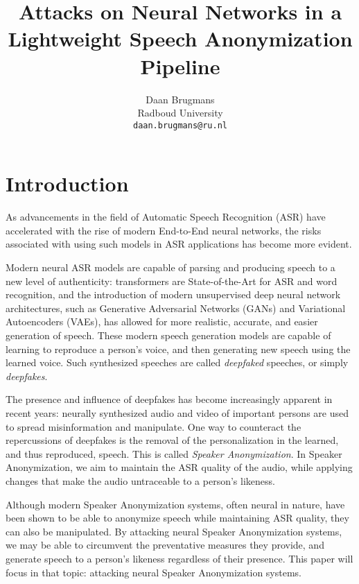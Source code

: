 \documentclass[11pt]{article}
\title{Attacks on Neural Networks in a Lightweight Speech Anonymization Pipeline}
\author{Daan Brugmans \\
  Radboud University\\
  \texttt{daan.brugmans@ru.nl}
}
\begin{document}
\maketitle

\begin{abstract}
  
\end{abstract}

\section{Introduction}
As advancements in the field of Automatic Speech Recognition (ASR) have accelerated with the rise of modern End-to-End neural networks, the risks associated with using such models in ASR applications has become more evident.

Modern neural ASR models are capable of parsing and producing speech to a new level of authenticity: transformers are State-of-the-Art for ASR and word recognition, and the introduction of modern unsupervised deep neural network architectures, such as Generative Adversarial Networks (GANs) and Variational Autoencoders (VAEs), has allowed for more realistic, accurate, and easier generation of speech.
These modern speech generation models are capable of learning to reproduce a person's voice, and then generating new speech using the learned voice.
Such synthesized speeches are called \textit{deepfaked} speeches, or simply \textit{deepfakes}.

The presence and influence of deepfakes has become increasingly apparent in recent years: neurally synthesized audio and video of important persons are used to spread misinformation and manipulate.
One way to counteract the repercussions of deepfakes is the removal of the personalization in the learned, and thus reproduced, speech.
This is called \textit{Speaker Anonymization}.
In Speaker Anonymization, we aim to maintain the ASR quality of the audio, while applying changes that make the audio untraceable to a person's likeness.

Although modern Speaker Anonymization systems, often neural in nature, have been shown to be able to anonymize speech while maintaining ASR quality, they can also be manipulated.
By attacking neural Speaker Anonymization systems, we may be able to circumvent the preventative measures they provide, and generate speech to a person's likeness regardless of their presence.
This paper will focus in that topic: attacking neural Speaker Anonymization systems.
\end{document}
